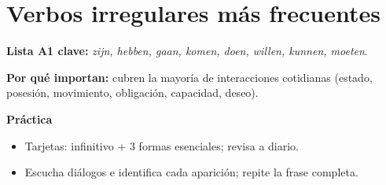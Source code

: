 \section{Verbos irregulares más frecuentes}
\textbf{Lista A1 clave:} \textit{zijn, hebben, gaan, komen, doen, willen, kunnen, moeten}.

\textbf{Por qué importan:} cubren la mayoría de interacciones cotidianas (estado, posesión, movimiento, obligación, capacidad, deseo).

\textbf{Práctica}
\begin{itemize}[leftmargin=*]
  \item Tarjetas: infinitivo + 3 formas esenciales; revisa a diario.
  \item Escucha diálogos e identifica cada aparición; repite la frase completa.
\end{itemize}
